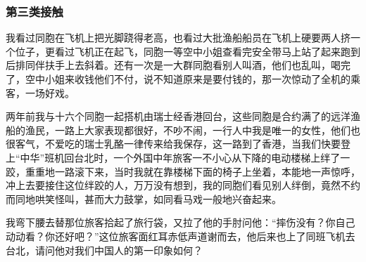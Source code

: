 \subsubsection*{第三类接触}
\par 我看过同胞在飞机上把光脚跷得老高，也看过大批渔船船员在飞机上硬要两人挤一个位子，更看过飞机正在起飞，同胞一等空中小姐查看完安全带马上站了起来跑到后排同伴扶手上去斜着。还有一次是一大群同胞看别人叫酒，他们也乱叫，喝完了，空中小姐来收钱他们不付，说不知道原来是要付钱的，那一次惊动了全机的乘客，一场好戏。
\par 两年前我与十六个同胞一起搭机由瑞士经香港回台，这些同胞是合约满了的远洋渔船的渔民，一路上大家表现都很好，不吵不闹，一行人中我是唯一的女性，他们也很客气，不爱吃的瑞士乳酪一律传来给我保存，这一路到了香港，当我们快要登上“中华”班机回台北时，一个外国中年旅客一不小心从下降的电动楼梯上绊了一跤，重重地一路滚下来，当时我就在靠楼梯下面的椅子上坐着，本能地一声惊呼，冲上去要接住这位绊跤的人，万万没有想到，我的同胞们看见别人绊倒，竟然不约而同地哄笑怪叫，甚而大力鼓掌，如同看马戏一般地兴奋起来。
\par 我弯下腰去替那位旅客拾起了旅行袋，又拉了他的手肘问他：“摔伤没有？你自己动动看？你还好吧？”这位旅客面红耳赤低声道谢而去，他后来也上了同班飞机去台北，请问他对我们中国人的第一印象如何？
